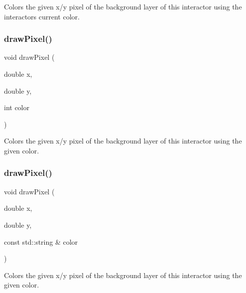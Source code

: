 Colors the given x/y pixel of the background layer of this interactor using the interactor\textquotesingle{}s current color. 

\mbox{\label{classGDrawingSurface_a3a64eb6383e601be8438e9c71643c432}} 
\subsubsection{\texorpdfstring{draw\+Pixel()}{drawPixel()}\hspace{0.1cm}{\footnotesize\ttfamily [2/3]}}
{\footnotesize\ttfamily void draw\+Pixel (\begin{DoxyParamCaption}\item[{double}]{x,  }\item[{double}]{y,  }\item[{int}]{color }\end{DoxyParamCaption})\hspace{0.3cm}{\ttfamily [virtual]}}



Colors the given x/y pixel of the background layer of this interactor using the given color. 

\mbox{\label{classGDrawingSurface_a20abc26a94b7eb310e34abf668e0f5f4}} 
\subsubsection{\texorpdfstring{draw\+Pixel()}{drawPixel()}\hspace{0.1cm}{\footnotesize\ttfamily [3/3]}}
{\footnotesize\ttfamily void draw\+Pixel (\begin{DoxyParamCaption}\item[{double}]{x,  }\item[{double}]{y,  }\item[{const std\+::string \&}]{color }\end{DoxyParamCaption})\hspace{0.3cm}{\ttfamily [virtual]}}



Colors the given x/y pixel of the background layer of this interactor using the given color. 

